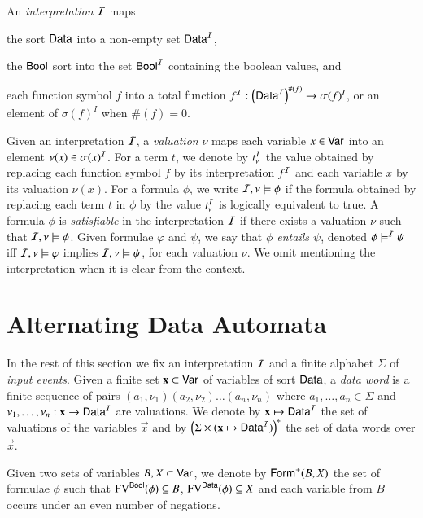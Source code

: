 \documentclass{llncs}
\begin{document}
An \emph{interpretation} $\mathcal{I}$ maps\begin{inparaenum}[(1)]
\item the sort $\mathsf{Data}$ into a non-empty set $\mathsf{Data}^{\mathcal{I}}$, 
\item the $\mathsf{Bool}$ sort into the set $\mathsf{Bool}^{\mathcal{I}}$ containing the boolean
  values, and
\item each function symbol $f$ into a total function $f^{\mathcal{I}} :
  \left(\mathsf{Data}^{\mathcal{I}}\right)^{\#(f)} \rightarrow \sigma(f)^I$, or an element of
  $\sigma(f)^I$ when $\#(f)=0$.
\end{inparaenum}
Given an interpretation $\mathcal{I}$, a \emph{valuation} $\nu$ maps each
variable $x \in \mathsf{Var}$ into an element $\nu(x) \in \sigma(x)^{\mathcal{I}}$. For
a term $t$, we denote by $t^{\mathcal{I}}_\nu$ the value obtained by replacing
each function symbol $f$ by its interpretation $f^{\mathcal{I}}$ and each
variable $x$ by its valuation $\nu(x)$. For a formula $\phi$, we write
$\mathcal{I},\nu \models \phi$ if the formula obtained by replacing each term
$t$ in $\phi$ by the value $t^{\mathcal{I}}_\nu$ is logically equivalent to true.
A formula $\phi$ is \emph{satisfiable} in the interpretation $\mathcal{I}$ if
there exists a valuation $\nu$ such that $\mathcal{I},\nu \models \phi$. Given
formulae $\varphi$ and $\psi$, we say that \emph{$\phi$ entails
  $\psi$}, denoted $\phi \models^{\mathcal{I}} \psi$ iff $\mathcal{I},\nu \models \varphi$
implies $\mathcal{I},\nu \models \psi$, for each valuation $\nu$. We omit
mentioning the interpretation when it is clear from the context. 

\section{Alternating Data Automata}

In the rest of this section we fix an interpretation $\mathcal{I}$ and a finite
alphabet $\Sigma$ of \emph{input events}. Given a finite set $\mathbf x
\subset \mathsf{Var}$ of variables of sort $\mathsf{Data}$, a \emph{data word} is a
finite sequence of pairs $(a_1,\nu_1)(a_2,\nu_2) \ldots (a_n,\nu_n)$
where $a_1,\ldots,a_n \in \Sigma$ and $\nu_1,\ldots,\nu_n : \mathbf x
\rightarrow \mathsf{Data}^{\mathcal{I}}$ are valuations. We denote by $\mathbf x \mapsto
\mathsf{Data}^{\mathcal{I}}$ the set of valuations of the variables $\vec{x}$ and by
$\left(\Sigma \times (\mathbf x \mapsto \mathsf{Data}^{\mathcal{I}})\right)^*$ the set of
data words over $\vec{x}$. 

Given two sets of variables $B,X \subset \mathsf{Var}$, we denote by
$\mathsf{Form}^+(B,X)$ the set of formulae $\phi$ such that $\mathrm{FV}^{\mathsf{Bool}}(\phi)
\subseteq B$, $\mathrm{FV}^{\mathsf{Data}}(\phi) \subseteq X$ and each variable from
$B$ occurs under an even number of negations. 
\end{document}
